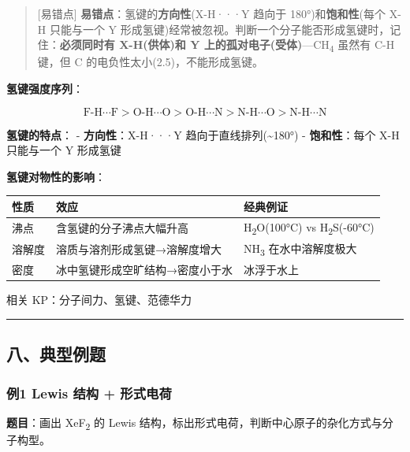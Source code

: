 \begin{quote}
{[}易错点{]} \textbf{易错点}：氢键的\textbf{方向性}(X-H···Y 趋向于 180°)和\textbf{饱和性}(每个 X-H 只能与一个 Y 形成氢键)经常被忽视。判断一个分子能否形成氢键时，记住：\textbf{必须同时有 X-H(供体)和 Y 上的孤对电子(受体)}---CH\textsubscript{4} 虽然有 C-H 键，但 C 的电负性太小(2.5)，不能形成氢键。
\end{quote}

\textbf{氢键强度序列}：

\[
\text{F-H} \cdots \text{F} > \text{O-H} \cdots \text{O} > \text{O-H} \cdots \text{N} > \text{N-H} \cdots \text{O} > \text{N-H} \cdots \text{N}
\]

\textbf{氢键的特点}：
- \textbf{方向性}：X-H···Y 趋向于直线排列(\textasciitilde180°)
- \textbf{饱和性}：每个 X-H 只能与一个 Y 形成氢键

\textbf{氢键对物性的影响}：

{\def\LTcaptype{none} %
\begin{longtable}[]{@{}lll@{}}
\toprule\noalign{}
性质 & 效应 & 经典例证 \\
\midrule\noalign{}
\endhead
\bottomrule\noalign{}
\endlastfoot
沸点 & 含氢键的分子沸点大幅升高 & H\textsubscript{2}O(100°C) vs H\textsubscript{2}S(-60°C) \\
溶解度 & 溶质与溶剂形成氢键→溶解度增大 & NH\textsubscript{3} 在水中溶解度极大 \\
密度 & 冰中氢键形成空旷结构→密度小于水 & 冰浮于水上 \\
\end{longtable}
}

相关 KP：分子间力、氢键、范德华力

\begin{center}\rule{0.5\linewidth}{0.5pt}\end{center}

\subsection{八、典型例题}\label{ux516bux5178ux578bux4f8bux9898}

\subsubsection{例1 Lewis 结构 + 形式电荷}\label{ux4f8b1-lewis-ux7ed3ux6784-ux5f62ux5f0fux7535ux8377}

\textbf{题目}：画出 XeF\textsubscript{2} 的 Lewis 结构，标出形式电荷，判断中心原子的杂化方式与分子构型。

